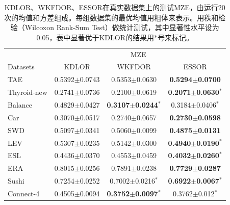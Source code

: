 \begin{table}[!h]
\caption{KDLOR、WKFDOR、ESSOR在真实数据集上的测试MZE，由运行20次的均值和方差组成。每组数据集的最优均值用粗体来表示。用秩和检验（Wilcoxon Rank-Sum Test）做统计测试，其中显著性水平设为0.05，表中显著优于KDLOR的结果用$*$号来标记。}
\label{table_essor_mze}
\centering
\begin{tabular}{l|ccc}
\toprule
& \multicolumn {3}{c}{MZE} \\
 \cmidrule {2-4}
Datasets & KDLOR & WKFDOR & ESSOR \\
\midrule
TAE & 0.5392$\pm$0.0743 & 0.5353$\pm$0.0630 &  {\bf 0.5294$\pm$0.0700} \\
Thyroid-new  & 0.2741$\pm$0.0736 & 0.2100$\pm$0.0619 &  {\bf 0.2071$\pm$0.0630}$^{*}$ \\
Balance & 0.4829$\pm$0.0427 & {\bf 0.3107$\pm$0.0244}$^{*}$ &  0.3184$\pm$0.0406$^{*}$ \\
Car & 0.3070$\pm$0.0517 & 0.2740$\pm$0.0657 &  {\bf 0.2730$\pm$0.0598} \\
SWD & 0.5097$\pm$0.0341 & 0.5060$\pm$0.0099 &  {\bf 0.4875$\pm$0.0131} \\
LEV & 0.5307$\pm$0.0235 & 0.5142$\pm$0.0300 &  {\bf 0.4940$\pm$0.0190}$^{*}$ \\
ESL & 0.4436$\pm$0.0370 & 0.4553$\pm$0.0459 &  {\bf 0.4032$\pm$0.0260}$^{*}$ \\
ERA  & 0.8015$\pm$0.0256 & 0.7891$\pm$0.0238 & {\bf 0.7729$\pm$0.0287} \\
Sushi & 0.7254$\pm$0.0252 & 0.7002$\pm$0.0216$^{*}$ & {\bf 0.6922$\pm$0.0067}$^{*}$ \\
Connect-4 & 0.4505$\pm$0.0094 & {\bf 0.3752$\pm$0.0097}$^{*}$ & 0.3762$\pm$0.012$^{*}$ \\
\bottomrule
\end{tabular}
\end{table}

